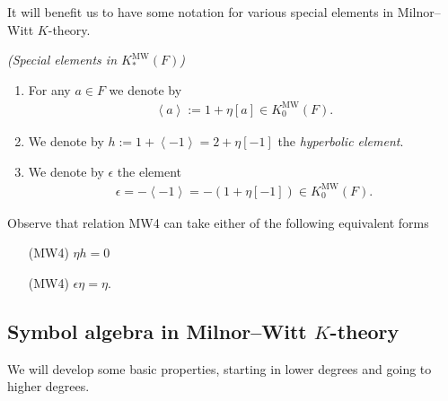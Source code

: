 \documentclass[11pt,openany]{book}
\providecommand{\MW}{\mathrm{MW}}
\begin{document}
It will benefit us to have some notation for various special elements in Milnor--Witt $K$-theory.

\begin{notation}\label{nota:special-elts-KMW} \textit{(Special elements in $K_\ast^\MW(F)$)}
\begin{enumerate}
    \item For any $a \in F$ we denote by
\begin{align*}
    \left\langle a \right\rangle := 1 + \eta[a] \in K_0^\MW(F).
\end{align*}
    \item We denote by $h := 1 + \left\langle -1 \right\rangle = 2 + \eta[-1]$ the \textit{hyperbolic element}.
    \item We denote by $\epsilon$ the element
    \begin{align*}
        \epsilon = - \left\langle -1 \right\rangle = -(1 + \eta[-1]) \in K_0^\MW(F).
    \end{align*}
\end{enumerate}
\end{notation}

\begin{remark} Observe that relation MW4 can take either of the following equivalent forms
\begin{enumerate}
    \item[(MW4)] $\eta h = 0$
    \item[(MW4)] $\epsilon \eta = \eta$.
\end{enumerate}
\end{remark}


\subsection{Symbol algebra in Milnor--Witt $K$-theory}

We will develop some basic properties, starting in lower degrees and going to higher degrees.
\end{document}
